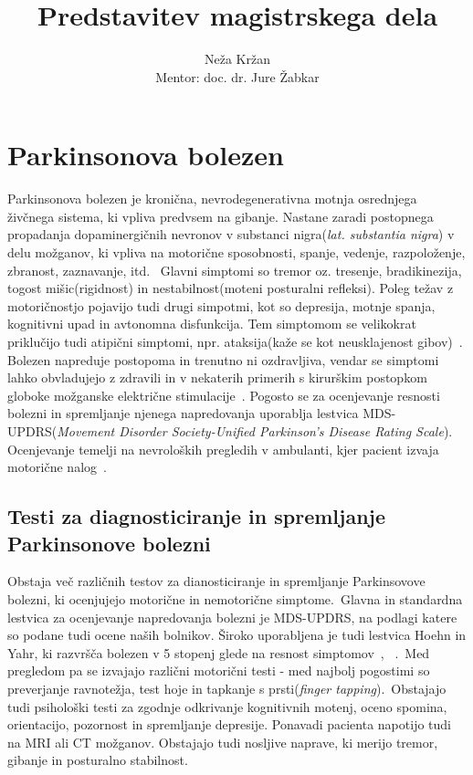 \documentclass[a4paper,12pt]{article}  %
\title{Predstavitev magistrskega dela}   %
\author{Neža Kržan \\
Mentor: doc. dr. Jure Žabkar}          %
\begin{document}
\maketitle

\section{Parkinsonova bolezen}

Parkinsonova bolezen je kronična, nevrodegenerativna motnja osrednjega živčnega sistema, ki vpliva 
predvsem na gibanje. Nastane zaradi postopnega propadanja dopaminergičnih nevronov v substanci 
nigra(\textit{lat. substantia nigra}) v delu možganov, ki vpliva na motorične sposobnosti, spanje, vedenje, 
razpoloženje, zbranost, zaznavanje, itd. \
Glavni simptomi so tremor oz. tresenje, bradikinezija, togost mišic(rigidnost) in nestabilnost(moteni posturalni refleksi). 
Poleg težav z motoričnostjo pojavijo tudi drugi simpotmi, kot so depresija, 
motnje spanja, kognitivni upad in avtonomna disfunkcija. Tem simptomom se velikokrat priklučijo tudi 
atipični simptomi, npr. ataksija(kaže se kot neusklajenost gibov)~\cite{NINDS}. \\

Bolezen napreduje postopoma in trenutno ni ozdravljiva, vendar se simptomi lahko obvladujejo z zdravili 
in v nekaterih primerih s kirurškim postopkom globoke možganske električne stimulacije~\cite{Sveinbjornsdottir}. 
Pogosto se za ocenjevanje resnosti bolezni in spremljanje njenega napredovanja uporablja lestvica 
MDS-UPDRS(\textit{Movement Disorder Society-Unified Parkinson's Disease Rating Scale}). Ocenjevanje temelji na 
nevroloških pregledih v ambulanti, kjer pacient izvaja motorične nalog~\cite{Goetz}. \\

\subsection{Testi za diagnosticiranje in spremljanje Parkinsonove bolezni}

Obstaja več različnih testov za dianosticiranje in spremljanje Parkinsovove bolezni, ki ocenjujejo 
motorične in nemotorične simptome.\
Glavna in standardna lestvica za ocenjevanje napredovanja bolezni je MDS-UPDRS, na podlagi katere so 
podane tudi ocene naših bolnikov. Široko uporabljena je tudi lestvica Hoehn in Yahr, ki razvršča 
bolezen v 5 stopenj glede na resnost simptomov~\cite{Bhidayasiri}, ~\cite{wiki}.\
Med pregledom pa se izvajajo različni motorični testi - med najbolj pogostimi so preverjanje ravnotežja, 
test hoje in tapkanje s prsti(\textit{finger tapping}).\
Obstajajo tudi psihološki testi za zgodnje odkrivanje kognitivnih motenj, oceno spomina, orientacijo, 
pozornost in spremljanje depresije. Ponavadi pacienta napotijo tudi na MRI ali CT možganov. Obstajajo 
tudi nosljive naprave, ki merijo tremor, gibanje in posturalno stabilnost.
\end{document}
